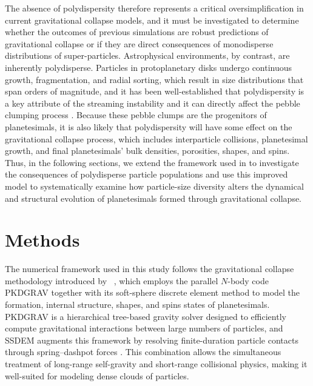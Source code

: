 \documentclass[fleqn,usenatbib]{mnras}
\begin{document}
The absence of polydispersity therefore represents a critical oversimplification in current gravitational collapse models, and it must be investigated to determine whether the outcomes of previous simulations are robust predictions of gravitational collapse or if they are direct consequences of monodisperse distributions of super-particles. 
Astrophysical environments, by contrast, are inherently polydisperse.
Particles in protoplanetary disks undergo continuous growth, fragmentation, and radial sorting, which result in size distributions that span orders of magnitude, and it has been well-established that polydispersity is a key attribute of the streaming instability and it can directly affect the pebble clumping process \citep{Bai2010,Schaffer2018,Krapp2019,McNally2021,Rucska2023,Matthijsse2025}. 
Because these pebble clumps are the progenitors of planetesimals, it is also likely that polydispersity will have some effect on the gravitational collapse process, which includes interparticle collisions, planetesimal growth, and final planetesimals' bulk densities, porosities, shapes, and spins.
Thus, in the following sections, we extend the framework used in \citet{Barnes2025} to investigate the consequences of polydisperse particle populations and use this improved model to systematically examine how particle-size diversity alters the dynamical and structural evolution of planetesimals formed through gravitational collapse.


\section{Methods}\label{sec:Methods}
The numerical framework used in this study follows the gravitational collapse methodology introduced by ~\citet{Barnes2025}, which employs the parallel $N$-body code PKDGRAV \citep[Parallel K-D Tree GRAVity;][]{Dikaiakos1996,Stadel2001,Richardson2000} together with its soft-sphere discrete element method \citep[SSDEM;][]{Schwartz2012,Zhang2017} to model the formation, internal structure, shapes, and spins states of planetesimals. 
PKDGRAV is a hierarchical tree-based gravity solver designed to efficiently compute gravitational interactions between large numbers of particles, and SSDEM augments this framework by resolving finite-duration particle contacts through spring–dashpot forces \citep{Schwartz2012,Zhang2017}. 
This combination allows the simultaneous treatment of long-range self-gravity and short-range collisional physics, making it well-suited for modeling dense clouds of particles.
\end{document}

